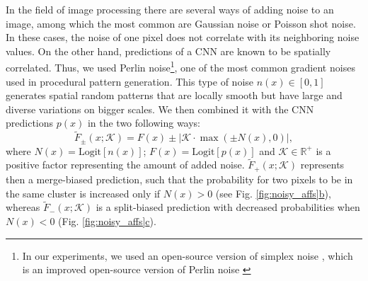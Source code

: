 In the field of image processing there are several ways of adding noise to an image, among which the most common are Gaussian noise or Poisson shot noise. 
In these cases, the noise of one pixel does not correlate with its neighboring noise values. On the other hand, predictions of a CNN are known to be spatially correlated. 
Thus, we used Perlin noise\footnote{In our experiments, we used an open-source version of simplex noise \cite{perlin2001noise}, which is an improved open-source version of Perlin noise \cite{perlin1985image}}, one of the most common gradient noises used in procedural pattern generation. This type of noise $n(x)\in[0,1]$ generates spatial random patterns that are locally smooth but have large and diverse variations on bigger scales. We then combined it with the CNN predictions $p(x)$ in the two following ways: 
\begin{equation}\label{eq:noise_biased_predictions}
\tilde{F}_{\pm}(x;\mathcal{K})=F(x)\pm\big|\mathcal{K}\cdot\max\left(\pm N(x),0\right)\big|,
\end{equation}
where  $N(x)=\mathrm{Logit}[n(x)]$; $F(x)=\mathrm{Logit}[p(x)]$ and $\mathcal{K}\in \mathbb{R}^+$ is a positive factor representing the amount of added noise. $\tilde{F}_{+}(x;\mathcal{K})$ represents then a merge-biased prediction, such that the probability for two pixels to be in the same cluster is increased only if $N(x)>0$ (see Fig. \hyperref[fig:noisy_affs]{\ref*{fig:noisy_affs}b}), whereas $\tilde{F}_{-}(x;\mathcal{K})$ is a split-biased prediction with decreased probabilities when $N(x)<0$ (Fig. \hyperref[fig:noisy_affs]{\ref*{fig:noisy_affs}c}). 


